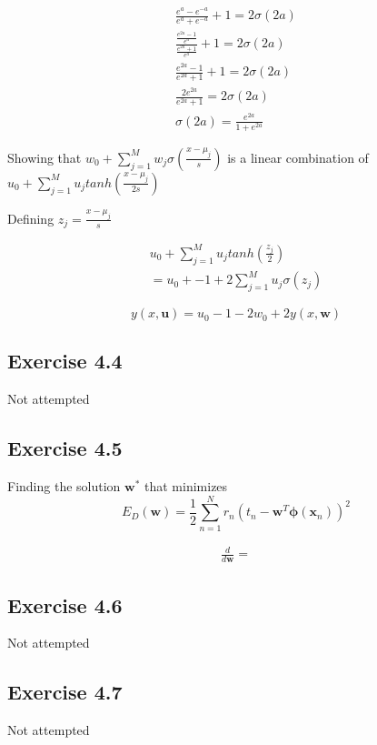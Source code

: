 \begin{gather}
  \frac{e^a-e^{-a}}{e^a+e^{-a}} +1 = 2\sigma(2a) \\
  \frac{\frac{e^{2a} -1}{e^a} }{\frac{e^{2a} +1}{e^a}} +1 =2\sigma(2a) \\
  \frac{e^{2a}-1}{e^{2a}+1} + 1 = 2\sigma(2a) \\
  \frac{2e^{2a}}{e^{2a}+1} = 2\sigma(2a) \\
  \sigma(2a) = \frac{e^{2a}}{1+e^{2a}}
\end{gather}


Showing that $w_0 + \sum_{j=1}^{M}w_j\sigma(\frac{x-\mu_j}{s}) $ is a linear combination of $ u_0 + \sum_{j=1}^{M}u_j tanh(\frac{x-\mu_j}{2s})$

Defining $z_j = \frac{x-\mu_j}{s}$

\begin{gather}
  u_0 + \sum_{j=1}^{M}u_j tanh(\frac{z_j}{2}) \\ 
  = u_0 + -1 + 2\sum_{j=1}^{M}u_j \sigma(z_j)
\end{gather}

\begin{equation}
  y(x,\mathbf{u}) = u_0 -1 -2w_0 + 2y(x,\mathbf{w}) 
\end{equation}


\subsection{Exercise 4.4}
Not attempted

\subsection{Exercise 4.5}
Finding the solution $\mathbf{w^*}$ that minimizes 
\begin{equation}
  E_D(\mathbf{w}) = \frac{1}{2}\sum_{n=1}^{N}r_n(t_n - \mathbf{w}^T \mathbf{\phi}(\mathbf{x}_n))^2
\end{equation}

\begin{gather}
  \frac{d}{d\mathbf{w}} = 
\end{gather}
\subsection{Exercise 4.6}
Not attempted

\subsection{Exercise 4.7}
Not attempted

